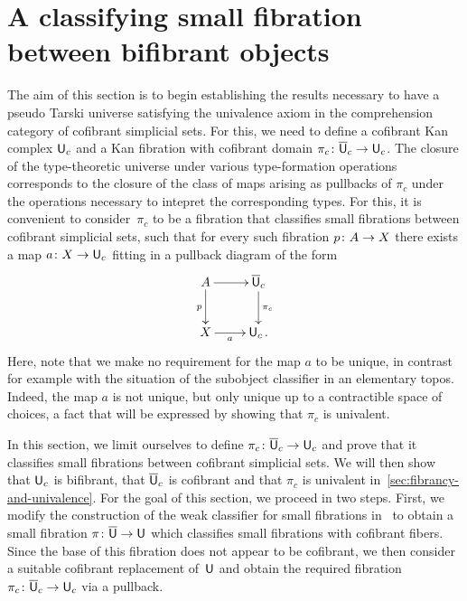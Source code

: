 \documentclass[reqno,10pt,a4paper,oneside,draft]{amsart}
\begin{document}
 

\section{A  classifying small fibration between bifibrant objects}
\label{sec:unifbb}


The aim of this section is to begin establishing the results necessary to have a pseudo Tarski
universe satisfying the univalence axiom in the comprehension category of cofibrant simplicial
sets. For this, we need to define a cofibrant Kan complex $\mathsf{U}_c$ and a Kan 
fibration with cofibrant domain $\pi_c \colon \overline{\mathsf{U}}_c \to \mathsf{U}_c$. The closure of the type-theoretic universe under various type-formation operations
corresponds to the closure of the class of maps arising as pullbacks of $\pi_c$ under the 
operations necessary to intepret the corresponding types. For this, it is convenient to 
consider~$\pi_c$ to be a fibration that classifies small fibrations between cofibrant simplicial
sets, \ie such that for every such fibration $p \colon A \to X$ there exists a map $a \colon X \to \mathsf{U}_c$ fitting in a pullback diagram of the form
\[
\xymatrix{
A \ar[r] \ar[d]_p   & \UU_c \ar[d]^{\pi_c} \\
X \ar[r]_-a &  \U_c \, .}
\]
Here, note that we make no requirement for
the map $a$ to be unique, in contrast for example with the situation of the subobject classifier
in an elementary topos. Indeed, the map $a$ is not unique, but only unique  up to a contractible space
of choices, a fact that will be expressed by showing that $\pi_c$ is univalent. 

In this section, we limit ourselves to define $\pi_c \colon \overline{\mathsf{U}}_c \to \mathsf{U}_c$ and prove that it
classifies small fibrations between cofibrant simplicial sets. We will then show 
that $\mathsf{U}_c$ is bifibrant, that $\overline{\mathsf{U}}_c$ is cofibrant  and that $\pi_c$ is univalent 
in~\cref{sec:fibrancy-and-univalence}. For the goal of this section, we proceed in two steps. First, we modify  the construction of the weak classifier for small fibrations in~\cite{voevodsky-simplicial-model} to obtain a small fibration $\pi \colon \overline{\mathsf{U}} \to \mathsf{U}$ which classifies small fibrations with cofibrant fibers. Since the base of this fibration does not appear to be cofibrant,
we then consider a suitable cofibrant replacement  of~$\mathsf{U}$ and obtain the required fibration $\pi_c \colon \overline{\mathsf{U}}_c \to \mathsf{U}_c$ via a pullback. 

\medskip
\end{document}

